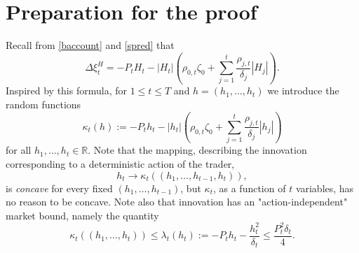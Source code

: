 \documentclass[a4paper]{article}
\begin{document}
\section{Preparation for the proof}\label{poof}




Recall from \eqref{baccount} and \eqref{spred} that
$$
\Delta \xi_{t}^{H}=-P_{t} H_{t}-|H_{t}|
\left(\rho_{0,t}\zeta_{0}
+\sum_{j=1}^{t}  
\frac{\rho_{j,t}}{\delta_{j}}|H_{j}|\right).
$$
Inspired by this formula, for $1\leq t\leq T$ and $h = (h_{1},\ldots,h_{t})$ we introduce the random functions
\begin{equation}\label{kappafg}
\kappa_{t}(h):= 
-P_{t} h_{t}-|h_{t}|\left( \rho_{0,t}\zeta_{0}+\sum_{j=1}^{t} 
\frac{\rho_{j,t}}{\delta_{j}} |h_{j}|\right)
\end{equation}
for all $h_{1},\ldots,h_{t}\in\mathbb{R}$. Note that the mapping, describing the innovation corresponding to a deterministic action of the trader,
$$
h_{t}\to \kappa_{t}((h_{1},\ldots,h_{t-1},h_{t})),
$$
is \emph{concave} for every fixed $(h_{1},\ldots,h_{t-1})$, 
but $\kappa_{t}$, as a function of $t$ variables, has no reason to be concave.
Note also that innovation has an "action-independent" market bound, namely the quantity
\begin{equation}\label{lambda}
\kappa_{t}((h_{1},\ldots,h_{t}))\leq \lambda_{t}(h_{t}):=-P_{t} h_{t}
-\frac{h_{t}^{2}}{\delta_{t}} \leq \frac{P_t^2 \delta_t}{4}.
\end{equation}
\end{document}
